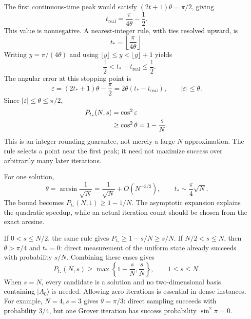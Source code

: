 \documentclass[11pt,oneside,openany]{book}
\providecommand{\ket}{}
\renewcommand{\ket}[1]{\lvert #1\rangle}
\theoremstyle{definition}
\begin{document}
The first continuous-time peak would satisfy $(2t+1)\theta=\pi/2$, giving
\begin{equation}
 t_{\mathrm{real}}=\frac\pi{4\theta}-\frac12.
\end{equation}
This value is nonnegative. A nearest-integer rule, with ties resolved upward, is
\begin{equation}
 t_*=\left\lfloor\frac\pi{4\theta}\right\rfloor.
 \label{eq:search-optimal-t}
\end{equation}
Writing $y=\pi/(4\theta)$ and using $\lfloor y\rfloor\le y<\lfloor y\rfloor+1$ yields
\begin{equation}
 -\frac12<t_*-t_{\mathrm{real}}\leq\frac12.
\end{equation}
The angular error at this stopping point is
\begin{equation}
 \varepsilon=(2t_*+1)\theta-\frac\pi2
 =2\theta(t_*-t_{\mathrm{real}}),\qquad |\varepsilon|\leq\theta.
\end{equation}
Since $|\varepsilon|\le\theta\le\pi/2$,
\begin{align}
 P_{t_*}(N,s)
 &=\cos^2\varepsilon\notag\\
 &\geq\cos^2\theta=1-\frac sN.
 \label{eq:search-success-bound}
\end{align}
This is an integer-rounding guarantee, not merely a large-$N$ approximation\cite{BBHT1998}. The rule selects a point near the first peak; it need not maximize success over arbitrarily many later iterations.

For one solution,
\begin{equation}
 \theta=\arcsin\frac1{\sqrt N}
 =\frac1{\sqrt N}+O(N^{-3/2}),\qquad
 t_*\sim\frac\pi4\sqrt N.
\end{equation}
The bound becomes $P_{t_*}(N,1)\ge1-1/N$. The asymptotic expansion explains the quadratic speedup, while an actual iteration count should be chosen from the exact arcsine.

If $0<s\le N/2$, the same rule gives $P_{t_*}\ge1-s/N\ge s/N$. If $N/2<s\le N$, then $\theta>\pi/4$ and $t_*=0$: direct measurement of the uniform state already succeeds with probability $s/N$. Combining these cases gives
\begin{equation}
 P_{t_*}(N,s)\geq\max\left\{1-\frac sN,\frac sN\right\},
 \qquad1\leq s\leq N.
 \label{eq:search-combined-bound}
\end{equation}
When $s=N$, every candidate is a solution and no two-dimensional basis containing $\ket{A_0}$ is needed. Allowing zero iterations is essential in dense instances. For example, $N=4,s=3$ gives $\theta=\pi/3$: direct sampling succeeds with probability $3/4$, but one Grover iteration has success probability $\sin^2\pi=0$.
\end{document}
